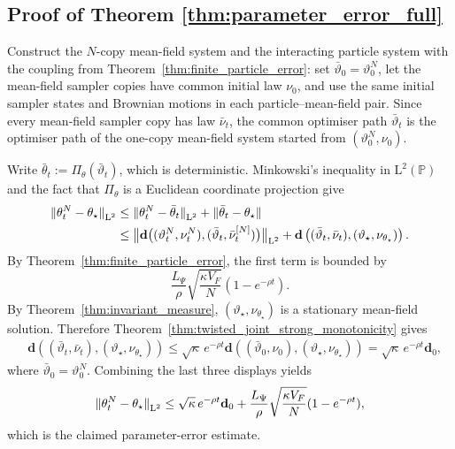 \subsection{Proof of Theorem \ref{thm:parameter_error_full}}\label{app:cor_parameter_error_full}
Construct the \(N\)-copy mean-field
system and the interacting particle system with the coupling from
Theorem~\ref{thm:finite_particle_error}: set
\(\bar\vartheta_0=\vartheta_0^N\), let the mean-field sampler copies have
common initial law \(\nu_0\), and use the same initial sampler states and
Brownian motions in each particle--mean-field pair. Since every
mean-field sampler copy has law \(\bar\nu_t\), the common optimiser path
\(\bar\vartheta_t\) is the optimiser path of the one-copy mean-field system
started from \((\vartheta_0^N,\nu_0)\).

Write \(\bar\theta_t:=\Pi_\theta(\bar\vartheta_t)\), which is deterministic. Minkowski's inequality in \(\mathrm{L}^2(\mathbb P)\)
and the fact that \(\Pi_\theta\) is a Euclidean coordinate projection give
\[
\begin{aligned}
\Ltwonorm{\theta_t^N-\theta_\star}
&\leq
\Ltwonorm{\theta_t^N-\bar\theta_t}
+
\|\bar\theta_t-\theta_\star\|\\
&\leq
\Ltwonorm[\big]{
\mathbf d\big(
(\vartheta_t^N,\nu_t^N),
(\bar\vartheta_t,\bar\nu_t^{[N]})
\big)} +
\mathbf d\left(
(\bar\vartheta_t,\bar\nu_t),
(\vartheta_\star,\nu_{\theta_\star})
\right).
\end{aligned}
\]
By Theorem~\ref{thm:finite_particle_error}, the first term is bounded by
\[
\frac{L_\Psi}{\rho}
\sqrt{\frac{\kappa V_F}{N}}
(1-e^{-\rho t}).
\]
By Theorem~\ref{thm:invariant_measure},
\((\vartheta_\star,\nu_{\theta_\star})\) is a stationary mean-field
solution. Therefore
Theorem~\ref{thm:twisted_joint_strong_monotonicity} gives
\[
\begin{aligned}
&\mathbf d\left(
(\bar\vartheta_t,\bar\nu_t),
(\vartheta_\star,\nu_{\theta_\star})
\right)\leq
\sqrt\kappa\,e^{-\rho t}
\mathbf d\left(
(\bar\vartheta_0,\nu_0),
(\vartheta_\star,\nu_{\theta_\star})
\right)
=
\sqrt\kappa\,e^{-\rho t}\mathbf d_0,
\end{aligned}
\]
where \(\bar\vartheta_0=\vartheta_0^N\). Combining the last three displays
yields
\[
\Ltwonorm{\theta_t^N-\theta_\star}
\leq
\sqrt\kappa\,e^{-\rho t}\mathbf d_0
+
\frac{L_\Psi}{\rho}
\sqrt{\frac{\kappa V_F}{N}}
(1-e^{-\rho t}),
\]
which is the claimed parameter-error estimate.